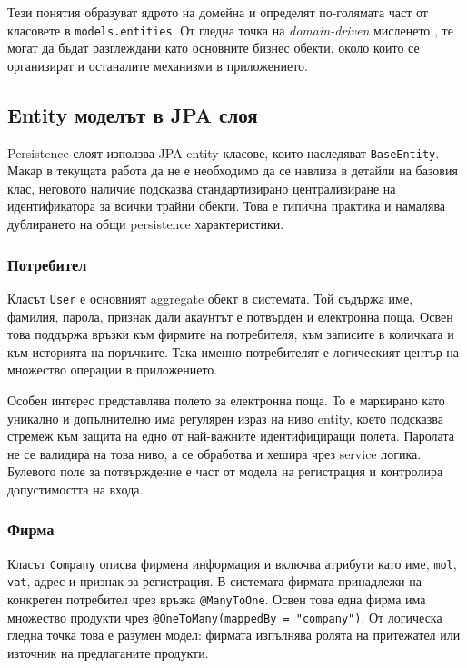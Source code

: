Тези понятия образуват ядрото на домейна и определят по-голямата част от класовете в \texttt{models.entities}. От гледна точка на \textit{domain-driven} мисленето \cite{evans}, те могат да бъдат разглеждани като основните бизнес обекти, около които се организират и останалите механизми в приложението.

\subsection{Entity моделът в JPA слоя}

Persistence слоят използва JPA entity класове, които наследяват \texttt{BaseEntity}. Макар в текущата работа да не е необходимо да се навлиза в детайли на базовия клас, неговото наличие подсказва стандартизирано централизиране на идентификатора за всички трайни обекти. Това е типична практика и намалява дублирането на общи persistence характеристики.

\subsubsection{Потребител}

Класът \texttt{User} е основният aggregate обект в системата. Той съдържа име, фамилия, парола, признак дали акаунтът е потвърден и електронна поща. Освен това поддържа връзки към фирмите на потребителя, към записите в количката и към историята на поръчките. Така именно потребителят е логическият център на множество операции в приложението.

Особен интерес представлява полето за електронна поща. То е маркирано като уникално и допълнително има регулярен израз на ниво entity, което подсказва стремеж към защита на едно от най-важните идентифициращи полета. Паролата не се валидира на това ниво, а се обработва и хешира чрез service логика. Булевото поле за потвърждение е част от модела на регистрация и контролира допустимостта на входа.

\subsubsection{Фирма}

Класът \texttt{Company} описва фирмена информация и включва атрибути като име, \texttt{mol}, \texttt{vat}, адрес и признак за регистрация. В системата фирмата принадлежи на конкретен потребител чрез връзка \texttt{@ManyToOne}. Освен това една фирма има множество продукти чрез \texttt{@OneToMany(mappedBy = "company")}. От логическа гледна точка това е разумен модел: фирмата изпълнява ролята на притежател или източник на предлаганите продукти.

